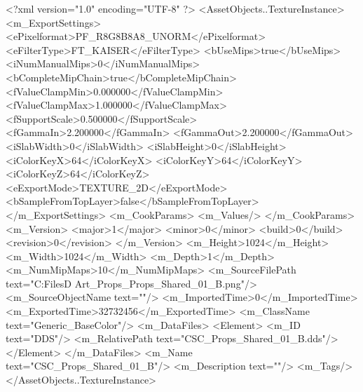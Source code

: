 <?xml version="1.0" encoding="UTF-8" ?>
<AssetObjects..TextureInstance>
	<m_ExportSettings>
		<ePixelformat>PF_R8G8B8A8_UNORM</ePixelformat>
		<eFilterType>FT_KAISER</eFilterType>
		<bUseMips>true</bUseMips>
		<iNumManualMips>0</iNumManualMips>
		<bCompleteMipChain>true</bCompleteMipChain>
		<fValueClampMin>0.000000</fValueClampMin>
		<fValueClampMax>1.000000</fValueClampMax>
		<fSupportScale>0.500000</fSupportScale>
		<fGammaIn>2.200000</fGammaIn>
		<fGammaOut>2.200000</fGammaOut>
		<iSlabWidth>0</iSlabWidth>
		<iSlabHeight>0</iSlabHeight>
		<iColorKeyX>64</iColorKeyX>
		<iColorKeyY>64</iColorKeyY>
		<iColorKeyZ>64</iColorKeyZ>
		<eExportMode>TEXTURE_2D</eExportMode>
		<bSampleFromTopLayer>false</bSampleFromTopLayer>
	</m_ExportSettings>
	<m_CookParams>
		<m_Values/>
	</m_CookParams>
	<m_Version>
		<major>1</major>
		<minor>0</minor>
		<build>0</build>
		<revision>0</revision>
	</m_Version>
	<m_Height>1024</m_Height>
	<m_Width>1024</m_Width>
	<m_Depth>1</m_Depth>
	<m_NumMipMaps>10</m_NumMipMaps>
	<m_SourceFilePath text="C:\Users\Shadow\Desktop\Working Files\3D Art\Textures\CSC_Props\Current\textures\CSC_Props_Shared_01_B.png"/>
	<m_SourceObjectName text=""/>
	<m_ImportedTime>0</m_ImportedTime>
	<m_ExportedTime>32732456</m_ExportedTime>
	<m_ClassName text="Generic_BaseColor"/>
	<m_DataFiles>
		<Element>
			<m_ID text="DDS"/>
			<m_RelativePath text="CSC_Props_Shared_01_B.dds"/>
		</Element>
	</m_DataFiles>
	<m_Name text="CSC_Props_Shared_01_B"/>
	<m_Description text=""/>
	<m_Tags/>
</AssetObjects..TextureInstance>

